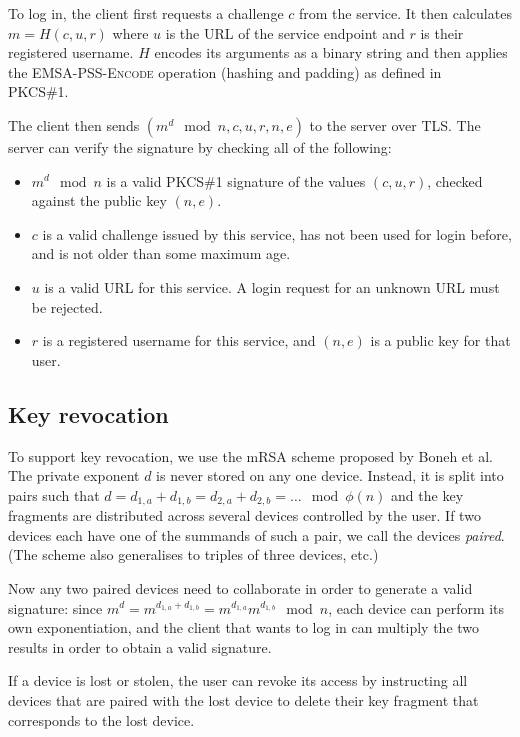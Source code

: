 \documentclass{acm_proc_article-sp}
\begin{document}
To log in, the client first requests a challenge $c$ from the service. It then calculates
$m = H(c, u, r)$ where $u$ is the URL of the service endpoint and $r$ is their registered username.
$H$ encodes its arguments as a binary string and then applies the \textsc{EMSA-PSS-Encode} operation
(hashing and padding) as defined in PKCS\#1.~\cite{PKCS1}

The client then sends $(m^d \mod n, c, u, r, n, e)$ to the server over TLS. The server can verify
the signature by checking all of the following:
\begin{itemize}
\item $m^d \mod n$ is a valid PKCS\#1 signature of the values $(c, u, r)$, checked against the
public key $(n, e)$.
\item $c$ is a valid challenge issued by this service, has not been used for login before, and is
not older than some maximum age.
\item $u$ is a valid URL for this service. A login request for an unknown URL must be rejected.
\item $r$ is a registered username for this service, and $(n, e)$ is a public key for that user.
\end{itemize}

\subsection{Key revocation}

To support key revocation, we use the mRSA scheme proposed by Boneh et al.~\cite{Boneh01} The
private exponent $d$ is never stored on any one device. Instead, it is split into pairs such that
$d = d_{1,a} + d_{1,b} = d_{2,a} + d_{2,b} = \dots \mod \phi(n)$ and the key fragments are
distributed across several devices controlled by the user. If two devices each have one of the
summands of such a pair, we call the devices \emph{paired}. (The scheme also generalises to
triples of three devices, etc.)

Now any two paired devices need to collaborate in order to generate a valid signature: since
$m^d = m^{d_{1,a} + d_{1,b}} = m^{d_{1,a}} m^{d_{1,b}} \mod n$, each device can perform its own
exponentiation, and the client that wants to log in can multiply the two results in order to obtain
a valid signature.

If a device is lost or stolen, the user can revoke its access by instructing all devices that are
paired with the lost device to delete their key fragment that corresponds to the lost device.
\end{document}
